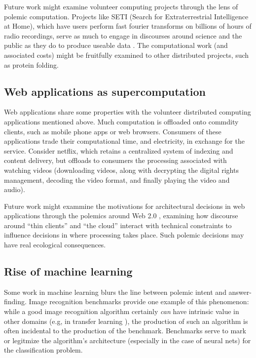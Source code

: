 \documentclass[sigconf]{acmart}
\begin{document}
Future work might examine volunteer computing projects through the lens of polemic computation.
Projects like SETI (Search for Extraterrestrial Intelligence at Home), which have users perform fast fourier transforms on billions of hours of radio recordings,
serve as much to engage in discourses around science and the public as they do to produce useable data 
\cite{Anderson2004}.
The computational work (and associated costs) might be fruitfully examined to other distributed projects, 
such as protein folding.


\subsection{Web applications as supercomputation}
\label{sec:orgca71ef8}

Web applications share some properties with the volunteer distributed computing applications mentioned above.
Much computation is offloaded onto commdity clients, such as mobile phone apps or web browsers.
Consumers of these applications trade their computational time, and electricity, in exchange for the service.
Consider netflix, which retains a centralized system of indexing and content delivery,
but offloads to consumers the processing associated with watching videos 
(downloading videos, along with decrypting the digital rights management, decoding the video format, and finally playing the video and audio).

Future work might exammine the motivations for architectural decisions in web applications through 
the polemics around Web 2.0 
\cite{Scholz2008},
examining how discourse around ``thin clients'' and ``the cloud''
interact with technical constraints
to influence decisions in where processing takes place.
Such polemic decisions may have real ecological consequences.


\subsection{Rise of machine learning}
\label{sec:org7abe6fc}

Some work in machine learning blurs the line 
between polemic intent and answer-finding.
Image recognition benchmarks provide one example of this phenomenon:
while a good image recognition algorithm certainly \emph{can} have intrinsic value in other domains 
(e.g, in transfer learning \cite{Jean2016f}),
the production of such an algorithm is often incidental to the production of the benchmark.
Benchmarks serve to mark or legitmize the algorithm's architecture (especially in the case of neural nets)
for the classification problem.
\end{document}
